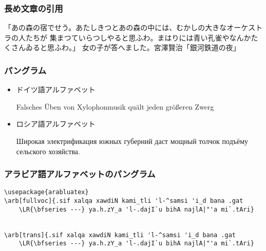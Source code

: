 \documentclass[11pt]{beamer}
\begin{document}
\begin{frame}
    \frametitle{長め文章の引用}
    \begin{leftbar}
        「あの森の宿でせう。あたしきつとあの森の中には、むかしの大きなオーケストラの人たちが
        集まつていらつしやると思ふわ。まはりには青い孔雀やなんかたくさんゐると思ふわ。」
        女の子が答へました。\hfill 宮澤賢治「銀河鉄道の夜」
    \end{leftbar}
\end{frame}

\begin{frame}
    \frametitle{パングラム}
    \setlength{\leftmargini}{1em}
    \begin{itemize}
        \item ドイツ語アルファベット

            Falsches Üben von Xylophonmusik quält jeden größeren Zwerg

        \item ロシア語アルファベット

            Широкая электрификация южных губерний даст мощный толчок подъёму сельского хозяйства.
    \end{itemize}
\end{frame}

\begin{frame}[fragile]
    \frametitle{アラビア語アルファベットのパングラム}

    \setRL

    \setLR

    \begin{leftbar}
        \begin{lstlisting}
\usepackage{arabluatex}
\arb[fullvoc]{.sif xalqa xawdiN kami_tli 'l-^samsi 'i_d bana .gat
    \LR{\bfseries ---} ya.h.zY_a 'l-.dajI`u bihA najlA|"'a mi`.tAri}


\arb[trans]{.sif xalqa xawdiN kami_tli 'l-^samsi 'i_d bana .gat
    \LR{\bfseries ---} ya.h.zY_a 'l-.dajI`u bihA najlA|"'a mi`.tAri}
        \end{lstlisting}
    \end{leftbar}
\end{frame}
\end{document}
